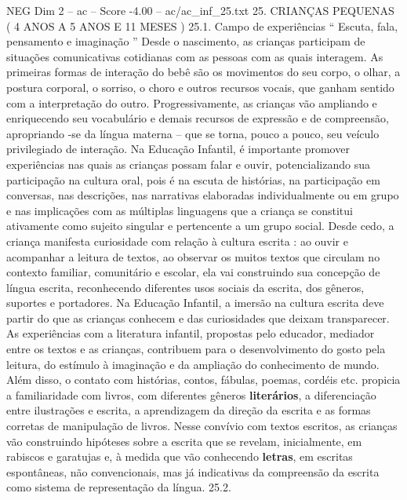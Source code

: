 \begin{textsample}{NEG Dim 2 – ac – Score -4.00 – ac/ac\_inf\_25.txt}  \label{ex:f2_neg_123}
25.
CRIANÇAS PEQUENAS ( 4 ANOS A 5 ANOS E 11 MESES ) 25.1.
Campo de experiências “ Escuta, fala, pensamento e imaginação ” Desde o nascimento, as crianças participam de situações comunicativas cotidianas com as pessoas com as quais interagem.
As primeiras formas de interação do bebê são os movimentos do seu corpo, o olhar, a postura corporal, o sorriso, o choro e outros recursos vocais, que ganham sentido com a interpretação do outro.
Progressivamente, as crianças vão ampliando e enriquecendo seu vocabulário e demais recursos de expressão e de compreensão, apropriando -se da língua materna – que se torna, pouco a pouco, seu veículo privilegiado de interação.
Na Educação Infantil, é importante promover experiências nas quais as crianças possam falar e ouvir, potencializando sua participação na cultura oral, pois é na escuta de histórias, na participação em conversas, nas descrições, nas narrativas elaboradas individualmente ou em grupo e nas implicações com as múltiplas linguagens que a criança se constitui ativamente como sujeito singular e pertencente a um grupo social.
Desde cedo, a criança manifesta curiosidade com relação à cultura escrita : ao ouvir e acompanhar a leitura de textos, ao observar os muitos textos que circulam no contexto familiar, comunitário e escolar, ela vai construindo sua concepção de língua escrita, reconhecendo diferentes usos sociais da escrita, dos gêneros, suportes e portadores.
Na Educação Infantil, a imersão na cultura escrita deve partir do que as crianças conhecem e das curiosidades que deixam transparecer.
As experiências com a literatura infantil, propostas pelo educador, mediador entre os textos e as crianças, contribuem para o desenvolvimento do gosto pela leitura, do estímulo à imaginação e da ampliação do conhecimento de mundo.
Além disso, o contato com histórias, contos, fábulas, poemas, cordéis etc. propicia a familiaridade com livros, com diferentes gêneros \textbf{literários}, a diferenciação entre ilustrações e escrita, a aprendizagem da direção da escrita e as formas corretas de manipulação de livros.
Nesse convívio com textos escritos, as crianças vão construindo hipóteses sobre a escrita que se revelam, inicialmente, em rabiscos e garatujas e, à medida que vão conhecendo \textbf{letras}, em escritas espontâneas, não convencionais, mas já indicativas da compreensão da escrita como sistema de representação da língua. 25.2.

\end{textsample}
